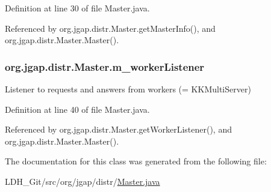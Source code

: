 Definition at line 30 of file Master.\-java.



Referenced by org.\-jgap.\-distr.\-Master.\-get\-Master\-Info(), and org.\-jgap.\-distr.\-Master.\-Master().

\hypertarget{classorg_1_1jgap_1_1distr_1_1_master_acc6cd5d74b76faad8aa60322f8333f89}{
\subsubsection[{m\-\_\-worker\-Listener}]{ org.\-jgap.\-distr.\-Master.\-m\-\_\-worker\-Listener\hspace{0.3cm}{\ttfamily [private]}}}\label{classorg_1_1jgap_1_1distr_1_1_master_acc6cd5d74b76faad8aa60322f8333f89}
Listener to requests and answers from workers (= K\-K\-Multi\-Server) 

Definition at line 40 of file Master.\-java.



Referenced by org.\-jgap.\-distr.\-Master.\-get\-Worker\-Listener(), and org.\-jgap.\-distr.\-Master.\-Master().



The documentation for this class was generated from the following file\-:\begin{DoxyCompactItemize}
\item 
L\-D\-H\-\_\-\-Git/src/org/jgap/distr/\hyperlink{_master_8java}{Master.\-java}\end{DoxyCompactItemize}
